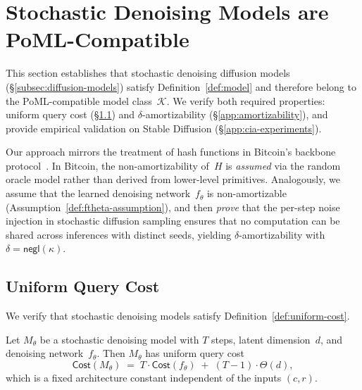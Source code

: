 
\section{Stochastic Denoising Models are PoML-Compatible}
\label{app:cia}

This section establishes that stochastic denoising diffusion models (\S\ref{subsec:diffusion-models}) satisfy Definition~\ref{def:model} and therefore belong to the PoML-compatible model class~$\mathcal{K}$. We verify both required properties: uniform query cost (\S\ref{app:uniform-cost}) and $\delta$-amortizability (\S\ref{app:amortizability}), and provide empirical validation on Stable Diffusion (\S\ref{app:cia-experiments}).

Our approach mirrors the treatment of hash functions in Bitcoin's backbone protocol~\cite{GKL20}. In Bitcoin, the non-amortizability of~$H$ is \emph{assumed} via the random oracle model rather than derived from lower-level primitives. Analogously, we assume that the learned denoising network~$f_\theta$ is non-amortizable (Assumption~\ref{def:ftheta-assumption}), and then \emph{prove} that the per-step noise injection in stochastic diffusion sampling ensures that no computation can be shared across inferences with distinct seeds, yielding $\delta$-amortizability with $\delta = \mathsf{negl}(\kappa)$.

\subsection{Uniform Query Cost}
\label{app:uniform-cost}

We verify that stochastic denoising models satisfy Definition~\ref{def:uniform-cost}.

\begin{lemma}
\label{lem:uniform-cost-app}
Let $M_\theta$ be a stochastic denoising model with $T$ steps, latent dimension~$d$, and denoising network~$f_\theta$. Then $M_\theta$ has uniform query cost
\[
    \mathsf{Cost}(M_\theta) \;=\; T \cdot \mathsf{Cost}(f_\theta) \;+\; (T-1) \cdot \Theta(d),
\]
which is a fixed architecture constant independent of the inputs $(c, r)$.
\end{lemma}

